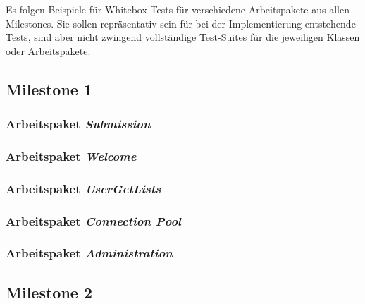 \lstset{
    language=Java,
    basicstyle=\ttfamily\selectfont\scriptsize,
}

\newcommand{\testlisting}[1]{}

Es folgen Beispiele für Whitebox-Tests für verschiedene Arbeitspakete aus allen Milestones.
Sie sollen repräsentativ sein für bei der Implementierung entstehende Tests, sind aber nicht zwingend vollständige
Test-Suites für die jeweiligen Klassen oder Arbeitspakete.

\subsection{Milestone 1}\label{subsec:milestone1}

\subsubsection{Arbeitspaket \emph{Submission}}
\testlisting{SubmissionBackingTest}
\testlisting{SubmissionServiceTest}
\testlisting{SubmissionRepositoryTest}

\subsubsection{Arbeitspaket \emph{Welcome}}
\testlisting{LoginServiceTest}

\subsubsection{Arbeitspaket \emph{UserGetLists}}
\testlisting{UserRepositoryGetListTest}

\subsubsection{Arbeitspaket \emph{Connection Pool}}
\testlisting{TransactionTest}
\testlisting{ConnectionPoolTest}

\subsubsection{Arbeitspaket \emph{Administration}}
\testlisting{SystemSettingsRepositoryTest.java}

\subsection{Milestone 2}\label{subsec:milestone2}

